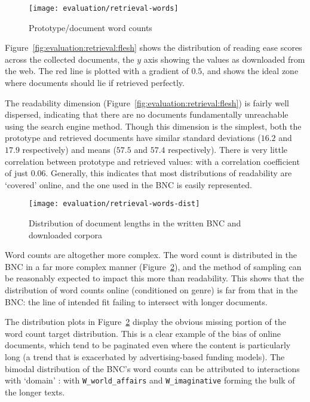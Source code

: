 \begin{figure}[ht]
    \centering
    \texttt{[image: evaluation/retrieval-words]}
    \caption{Prototype/document word counts}
    \label{fig:evaluation:retrieval:words}
\end{figure}

Figure~\ref{fig:evaluation:retrieval:flesh} shows the distribution of reading ease scores across the collected documents, the $y$ axis showing the values as downloaded from the web.  The red line is plotted with a gradient of $0.5$, and shows the ideal zone where documents should lie if retrieved perfectly.


The readability dimension (Figure~\ref{fig:evaluation:retrieval:flesh}) is fairly well dispersed, indicating that there are no documents fundamentally unreachable using the search engine method.  Though this dimension is the simplest, both the prototype and retrieved documents have similar standard deviations ($16.2$ and $17.9$ respectively) and means ($57.5$ and $57.4$ respectively).  There is very little correlation between prototype and retrieved values: with a correlation coefficient of just $0.06$.  Generally, this indicates that most distributions of readability are `covered' online, and the one used in the BNC is easily represented.

\begin{figure}[ht]
    \centering
    \texttt{[image: evaluation/retrieval-words-dist]}
    \caption{Distribution of document lengths in the written BNC and downloaded corpora}
    \label{fig:evaluation:retrieval:words-dist}
\end{figure}

Word counts are altogether more complex.  The word count is distributed in the BNC in a far more complex manner (Figure~\ref{fig:evaluation:retrieval:words-dist}), and the method of sampling can be reasonably expected to impact this more than readability.  This shows that the distribution of word counts online (conditioned on genre) is far from that in the BNC: the line of intended fit failing to intersect with longer documents.

The distribution plots in Figure~\ref{fig:evaluation:retrieval:words-dist} display the obvious missing portion of the word count target distribution.  This is a clear example of the bias of online documents, which tend to be paginated even where the content is particularly long (a trend that is exacerbated by advertising-based funding models).  The bimodal distribution of the BNC's word counts can be attributed to interactions with `domain'%
: with \texttt{W\_world\_affairs} and \texttt{W\_imaginative} forming the bulk of the longer texts.

